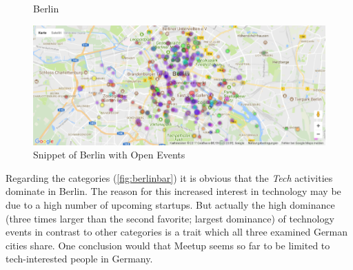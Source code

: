 \begin{figure}[!htp]
	\hfill
	\caption{Berlin}
\end{figure}


\begin{figure}[!htp]
	\includegraphics[width=1\linewidth]{images/Berlin_points.png}
	\caption{Snippet of Berlin with Open Events}\label{fig:berlinpoints}	
\end{figure}

Regarding the categories (\ref{fig:berlinbar}) it is obvious that the \emph{Tech} activities dominate in Berlin. The reason for this increased interest in technology may be due to a high number of upcoming startups. 
But actually the high dominance (three times larger than the second favorite; largest dominance) of technology events in contrast to other categories is a trait which all three examined German cities share. One conclusion would that Meetup seems so far to be limited to tech-interested people in Germany. 

